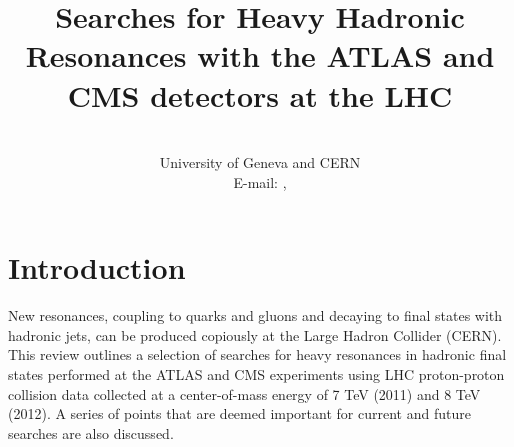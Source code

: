 \documentclass{PoS}
\title{Searches for Heavy Hadronic Resonances with the ATLAS and CMS detectors at the LHC}
\author{\speaker{Caterina Doglioni, Francesco Santanastasio}\\%
        University of Geneva and CERN\\
        E-mail: \email{caterina.doglioni@cern.ch}, \email{francesco.santanastasio@cern.ch}}
\newcommand{\antikt}{anti-$k_t$}
\begin{document}
\section{Introduction}
New resonances, coupling to quarks and gluons and decaying to final states with hadronic jets, 
can be produced copiously at the Large Hadron Collider (CERN). 
This review outlines a selection of searches for heavy resonances in hadronic final states 
performed at the ATLAS and CMS experiments using LHC proton-proton collision data collected 
at a center-of-mass energy of 7 TeV (2011) and 8 TeV (2012). A series of points that 
are deemed important for current and future searches are also discussed.



\end{document}
